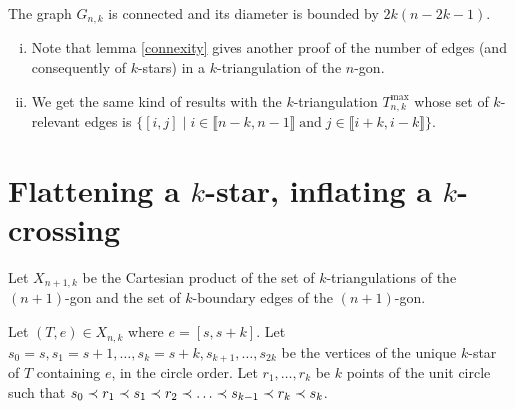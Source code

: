 \documentclass[12pt]{amsart}
\begin{document}
\begin{corollary}
The graph $G_{n,k}$ is connected and its diameter is bounded by $2k(n-2k-1)$.
\end{corollary}

\begin{remark}
\begin{enumerate}[(i)]
\item Note that lemma \ref{connexity} gives another proof of the number of edges (and consequently of $k$-stars) in a $k$-triangulation of the $n$-gon.
\item We get the same kind of results with the $k$-triangulation $T_{n,k}^{\max}$ whose set of $k$-relevant edges is $\{[i,j]\;|\;i\in\llbracket n-k,n-1\rrbracket\;\mathrm{and}\;j\in\llbracket i+k,i-k\rrbracket\}$.
\end{enumerate}
\end{remark}




\section{Flattening a $k$-star, inflating a $k$-crossing}\label{sectionflatinflat}





Let $X_{n+1,k}$ be the Cartesian product of the set of $k$-triangulations of the $(n+1)$-gon and the set of $k$-boundary edges of the $(n+1)$-gon.

Let $(T,e)\in X_{n,k}$ where $e=[s,s+k]$.
Let $s_0=s,s_1=s+1,\ldots,s_k=s+k,s_{k+1},\ldots,s_{2k}$ be the vertices of the unique $k$-star of $T$ containing $e$, in the circle order. Let $r_1,\ldots,r_k$ be $k$ points of the unit circle such that $s_0\prec r_1\prec s_1\prec r_2\prec \ldots\prec s_{k-1}\prec r_k\prec s_k$.
\end{document}
